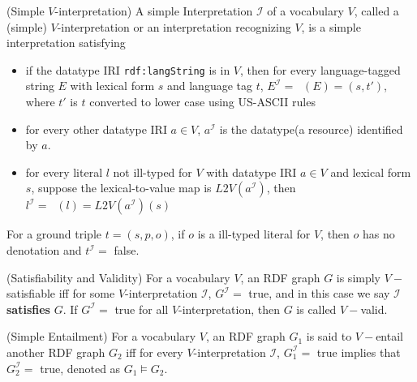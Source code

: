 \documentclass{article}
\DeclareMathOperator{\IL}{I_{L}}
\begin{document}
\begin{defin}(Simple $V$-interpretation)
A simple Interpretation $\mathcal{I}$ of a vocabulary $V$, called a (simple) $V$-interpretation or an interpretation recognizing $V$, is a simple interpretation satisfying 
\begin{itemize}
\item if the datatype IRI \texttt{rdf:langString} is in $V$, then for every language-tagged string $E$ with lexical form $s$ and language tag $t$, $E^{\mathcal{I}} = \IL(E) = (s,t')$, where $t'$ is $t$ converted to lower case using US-ASCII rules 
\item for every other datatype IRI $a\in V$, $a^{\mathcal{I}}$ is the datatype(a resource) identified by $a$. 
\item for every literal $l$ not ill-typed for $V$ with datatype IRI $a \in V$ and lexical form $s$, suppose the lexical-to-value map is $L2V(a^{\mathcal{I}})$, then $l^{\mathcal{I}} = \IL(l) = L2V(a^{\mathcal{I}})(s)$
\end{itemize}
\end{defin}
 For a ground triple $t = (s,p,o)$, if $o$ is a ill-typed literal for $V$, then $o$ has no denotation and $t^{\mathcal{I}} = $ false. 

\begin{defin}(Satisfiability and Validity)\newline
For a vocabulary $V$, an RDF graph $G$ is  simply $V-$satisfiable iff for some $V$-interpretation $\mathcal{I}$, $G^{\mathcal{I}} = $ true, and in this case we say $\mathcal{I}$ \textbf{satisfies} $G$. If $G^{\mathcal{I}} = $ true for all $V$-interpretation, then $G$ is called $V-$valid. 
\end{defin}

\begin{defin}(Simple Entailment)\newline
For a vocabulary $V$, an RDF graph $G_1$ is said to $V-$entail another RDF graph $G_2$ iff for every $V$-interpretation $\mathcal{I}$, $G_1^{\mathcal{I}} = $ true implies that $G_2^{\mathcal{I}} = $ true, denoted as $G_1 \vDash G_2$.
\end{defin}
\end{document}
